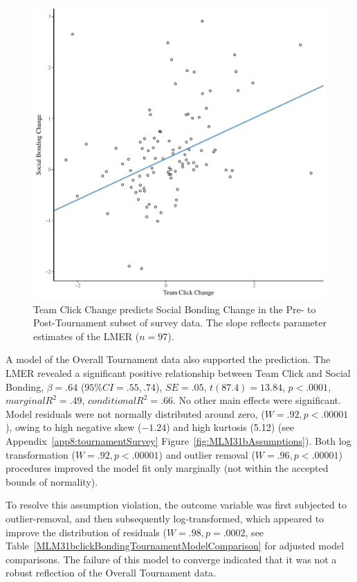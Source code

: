 \begin{CJK}{UTF8}{gbsn}
  \begin{figure}[htbp]
    \centering
  \includegraphics[scale=.5]{images/clickBondDeltaModelSlope.pdf}
    \caption{Team Click Change predicts Social Bonding Change in the Pre- to Post-Tournament subset of survey data. The slope reflects parameter estimates of the LMER ($n = 97$).}
    \label{fig:clickBondDeltaModelSlope}
  \end{figure}


A model of the Overall Tournament data also supported the prediction. The LMER revealed a significant positive relationship between  Team Click and Social Bonding, $\beta = .64$ ($95\% CI = .55, .74$), $SE = .05$, $t(87.4) = 13.84$, $p < .0001$, $marginal R^2 = .49$, $conditional R^2 = .66$. No other main effects were significant.  Model residuals were not normally distributed around zero, ($W = .92, p < .00001$), owing to high negative skew ($-1.24$) and high kurtosis (5.12) (see Appendix~\ref{app8:tournamentSurvey} Figure~\ref{fig:MLM31bAssumptions}).  Both log transformation ($W = .92, p < .00001$) and outlier removal ($W = .96, p < .00001$) procedures improved the model fit only marginally (not within the accepted bounds of normality).

To resolve this assumption violation, the outcome variable was first subjected to outlier-removal, and then subsequently log-transformed, which appeared to improve the distribution of residuals ($W = .98, p = .0002$, see Table~\ref{MLM31bclickBondingTournamentModelComparison} for adjusted model comparisons.  The failure of this model to converge indicated that it was not a robust reflection of the Overall Tournament data.












\end{CJK}
